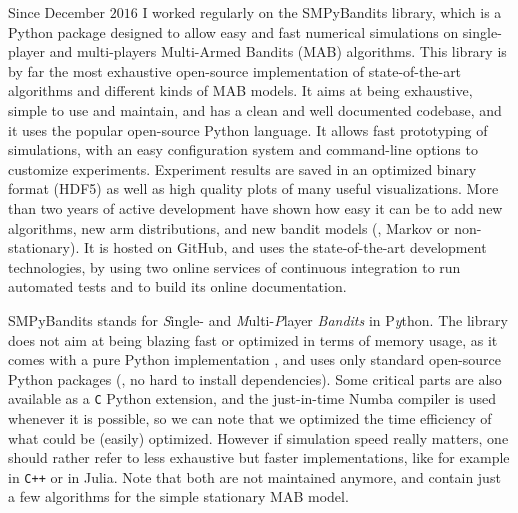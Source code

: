 Since December $2016$ I worked regularly on the SMPyBandits library, which is a Python package  designed to allow easy and fast numerical simulations on single-player and multi-players Multi-Armed Bandits (MAB) algorithms.
%
This library is by far the most exhaustive open-source implementation of state-of-the-art algorithms and different kinds of MAB models.
It aims at being exhaustive, simple to use and maintain, and has a clean and well documented codebase, and it uses the popular open-source Python language.
It allows fast prototyping of simulations, with an easy configuration system and command-line options to customize experiments.
Experiment results are saved in an optimized binary format (HDF5) as well as high quality plots of many useful visualizations.
%
More than two years of active development have shown how easy it can be to add new algorithms, new arm distributions, and new bandit models (\eg, Markov or non-stationary).
It is hosted on GitHub, and uses the state-of-the-art development technologies, by using two online services of continuous integration to run automated tests and to build its online documentation.

SMPyBandits stands for \emph{S}ingle- and \emph{M}ulti-\emph{P}layer \emph{Bandits} in P\emph{y}thon.
The library does not aim at being blazing fast or optimized in terms of memory usage, as it comes with a pure Python implementation \cite{python}, and uses only standard open-source Python packages (\ie, no hard to install dependencies).
Some critical parts are also available as a \texttt{C} Python extension, and the just-in-time Numba compiler \cite{numba} is used whenever it is possible, so we can note that we optimized the time efficiency of what could be (easily) optimized.
However if simulation speed really matters, one should rather refer to less exhaustive but faster implementations, like for example \cite{TorLibbandit} in \texttt{C++} or \cite{VishMABjl} in Julia. Note that both are not maintained anymore, and contain just a few algorithms for the simple stationary MAB model.

